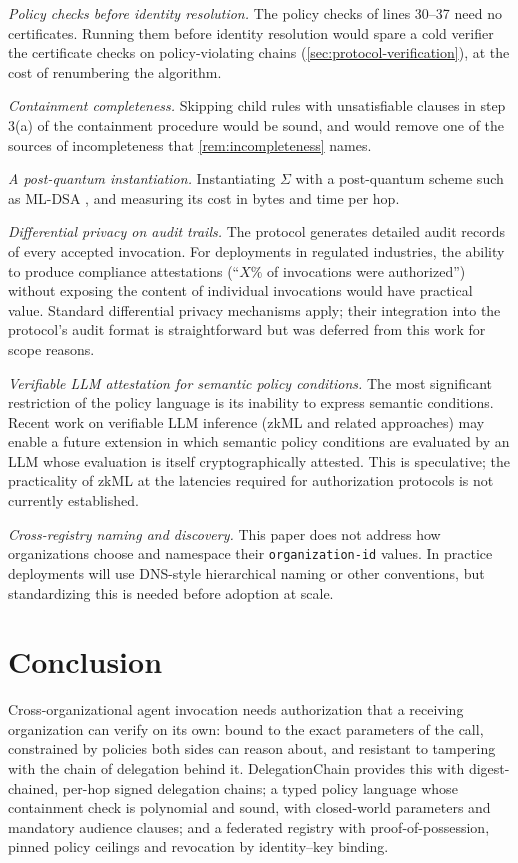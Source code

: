 \documentclass[11pt,a4paper]{article}
\begin{document}
\emph{Policy checks before identity resolution.} The policy checks of
lines 30--37 need no certificates. Running them before identity
resolution would spare a cold verifier the certificate checks on
policy-violating chains (\cref{sec:protocol-verification}), at the cost
of renumbering the algorithm.

\emph{Containment completeness.} Skipping child rules with
unsatisfiable clauses in step 3(a) of the containment procedure would be
sound, and would remove one of the sources of incompleteness that
\cref{rem:incompleteness} names.

\emph{A post-quantum instantiation.} Instantiating $\Sigma$ with a
post-quantum scheme such as ML-DSA \citep{fips204}, and measuring its
cost in bytes and time per hop.

\emph{Differential privacy on audit trails.} The protocol generates
detailed audit records of every accepted invocation. For deployments
in regulated industries, the ability to produce compliance attestations
(``$X\%$ of invocations were authorized'') without exposing the
content of individual invocations would have practical value.
Standard differential privacy mechanisms apply; their integration into
the protocol's audit format is straightforward but was deferred from
this work for scope reasons.

\emph{Verifiable LLM attestation for semantic policy conditions.}
The most significant restriction of the policy language is its
inability to express semantic conditions. Recent work on verifiable
LLM inference (zkML and related approaches) may enable a future
extension in which semantic policy conditions are evaluated by an LLM
whose evaluation is itself cryptographically attested. This is
speculative; the practicality of zkML at the latencies required for
authorization protocols is not currently established.

\emph{Cross-registry naming and discovery.} This paper does not
address how organizations choose and namespace their
\texttt{organization-id} values. In practice deployments will use
DNS-style hierarchical naming or other conventions, but standardizing
this is needed before adoption at scale.

\section{Conclusion}
\label{sec:conclusion}

Cross-organizational agent invocation needs authorization that a
receiving organization can verify on its own: bound to the exact
parameters of the call, constrained by policies both sides can reason
about, and resistant to tampering with the chain of delegation behind
it. DelegationChain provides this with digest-chained, per-hop signed
delegation chains; a typed policy language whose containment check is
polynomial and sound, with closed-world parameters and mandatory
audience clauses; and a federated registry with proof-of-possession,
pinned policy ceilings and revocation by identity--key binding.
\end{document}
